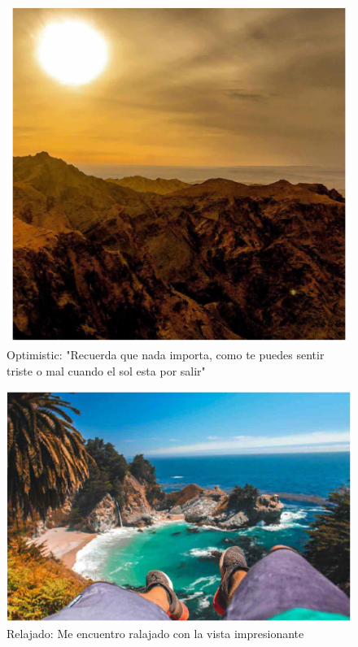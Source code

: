 \documentclass[conference]{IEEEtran}
\begin{document}
\begin{figure}
\centerline{\includegraphics[width=\textwidth,width=9cm]{figura8.png}}
\caption{Optimistic: "Recuerda que nada importa, como te puedes sentir triste o mal cuando el sol esta por salir"}
\label{fig}
\end{figure}

\begin{figure}
\centerline{\includegraphics[width=\textwidth,width=9cm]{figura9.png}}
\caption{Relajado: Me encuentro ralajado con la vista impresionante}
\label{fig}
\end{figure}
\end{document}
